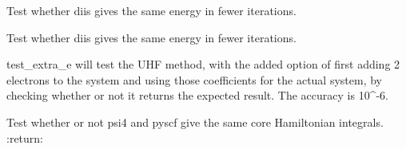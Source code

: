 \documentclass[letterpaper,10pt,english]{sphinxmanual}
\begin{document}
\begin{fulllineitems}
\label{\detokenize{tests:ghf.tests.test_auth.test_diis_rhf}}
Test whether diis gives the same energy in fewer iterations.

\end{fulllineitems}


\begin{fulllineitems}
\label{\detokenize{tests:ghf.tests.test_auth.test_diis_uhf}}
Test whether diis gives the same energy in fewer iterations.

\end{fulllineitems}


\begin{fulllineitems}
\label{\detokenize{tests:ghf.tests.test_auth.test_extra_e}}
test\_extra\_e will test the UHF method, with the added option of first adding 2 electrons to the system and using
those coefficients for the actual system, by checking whether or not it returns the expected result.
The accuracy is 10\textasciicircum{}-6.

\end{fulllineitems}


\begin{fulllineitems}
\label{\detokenize{tests:ghf.tests.test_auth.test_one_e}}
Test whether or not psi4 and pyscf give the same core Hamiltonian integrals.
:return:

\end{fulllineitems}

\end{document}
